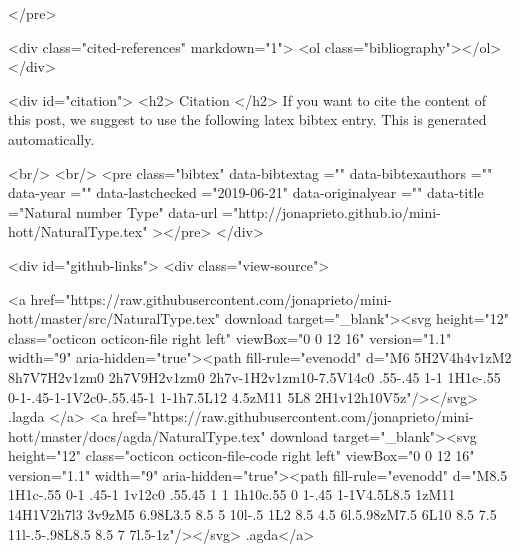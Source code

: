 </pre>


  <div class="cited-references" markdown="1">
  <ol class="bibliography"></ol>
  </div>


  
  <div id="citation">
  <h2> Citation </h2>
  If you want to cite the content of this post,
  we suggest to use the following latex bibtex entry.
  This is generated automatically.

  <br/>
  <br/>
  <pre class="bibtex"
       data-bibtextag =""
       data-bibtexauthors =""
       data-year =""
       data-lastchecked ="2019-06-21"
       data-originalyear =""
       data-title ="Natural number Type"
       data-url ="http://jonaprieto.github.io/mini-hott/NaturalType.tex"
  ></pre>
  </div>
  

  <div id="github-links">
    <div class="view-source">
      
        <a href="https://raw.githubusercontent.com/jonaprieto/mini-hott/master/src/NaturalType.tex" download target="_blank"><svg height="12" class="octicon octicon-file right left" viewBox="0 0 12 16" version="1.1" width="9" aria-hidden="true"><path fill-rule="evenodd" d="M6 5H2V4h4v1zM2 8h7V7H2v1zm0 2h7V9H2v1zm0 2h7v-1H2v1zm10-7.5V14c0 .55-.45 1-1 1H1c-.55 0-1-.45-1-1V2c0-.55.45-1 1-1h7.5L12 4.5zM11 5L8 2H1v12h10V5z"/></svg> .lagda </a>
        <a href="https://raw.githubusercontent.com/jonaprieto/mini-hott/master/docs/agda/NaturalType.tex" download target="_blank"><svg height="12" class="octicon octicon-file-code right left" viewBox="0 0 12 16" version="1.1" width="9" aria-hidden="true"><path fill-rule="evenodd" d="M8.5 1H1c-.55 0-1 .45-1 1v12c0 .55.45 1 1 1h10c.55 0 1-.45 1-1V4.5L8.5 1zM11 14H1V2h7l3 3v9zM5 6.98L3.5 8.5 5 10l-.5 1L2 8.5 4.5 6l.5.98zM7.5 6L10 8.5 7.5 11l-.5-.98L8.5 8.5 7 7l.5-1z"/></svg> .agda</a>
      
